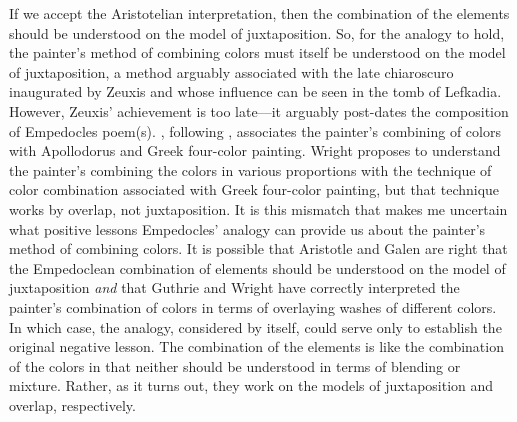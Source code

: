 If we accept the Aristotelian interpretation, then the combination of the elements should be understood on the model of juxtaposition. So, for the analogy to hold, the painter's method of combining colors must itself be understood on the model of juxtaposition, a method arguably associated with the late chiaroscuro inaugurated by Zeuxis and whose influence can be seen in the tomb of Lefkadia. However, Zeuxis' achievement is too late---it arguably post-dates the composition of Empedocles poem(s).  \citet[38--39]{Wright:1981zr}, following \citet[148]{Guthrie:1965ys}, associates the painter's combining of colors with Apollodorus and Greek four-color painting. Wright proposes to understand the painter's combining the colors in various proportions with the technique of color combination associated with Greek four-color painting, but that technique works by overlap, not juxtaposition. It is this mismatch that makes me uncertain what positive lessons Empedocles' analogy can provide us about the painter's method of combining colors. It is possible that Aristotle and Galen are right that the Empedoclean combination of elements should be understood on the model of juxtaposition \emph{and} that Guthrie and Wright have correctly interpreted the painter's combination of colors in terms of overlaying washes of different colors. In which case, the analogy, considered by itself, could serve only to establish the original negative lesson. The combination of the elements is like the combination of the colors in that neither should be understood in terms of blending or mixture. Rather, as it turns out, they work on the models of juxtaposition and overlap, respectively.

